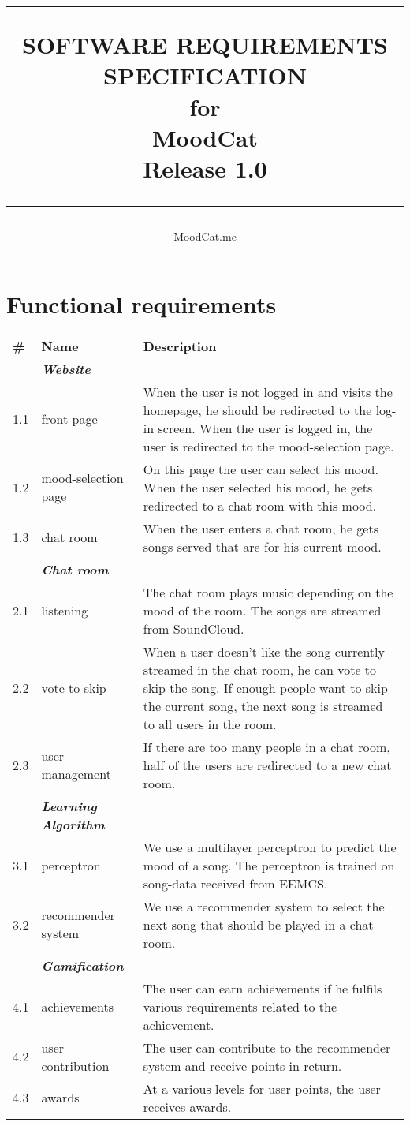 \documentclass{scrreprt}
\title{%
\flushright
\rule{16cm}{5pt}\vskip1cm
\Huge{SOFTWARE REQUIREMENTS\\ SPECIFICATION}\\
\vspace{2cm}
for\\
\vspace{2cm}
MoodCat\\
\vspace{2cm}
\LARGE{Release 1.0\\}
\vfill
\rule{16cm}{5pt}
}
\author{MoodCat.me}
\date{}
\begin{document}
\maketitle



\chapter*{Functional requirements}
\begin{table}[h]
\begin{tabular}{|p{0.5cm}|p{3.5cm}|p{14cm}|}
\textbf{\#} & \textbf{Name} & \textbf{Description} \\
         & \textbf{\textit{Website}} &  \\
   	  1.1   & front page & When the user is not logged in and visits the homepage, he should be redirected to the log-in screen.
   	   When the user is logged in, the user is redirected to the mood-selection page.  \\
      1.2   & mood-selection page & On this page the user can select his mood. When the user selected his mood, he gets redirected to a chat room with this mood.\\
      1.3  	& chat room & When the user enters a chat room, he gets songs served that are for his current mood. \\   
      		 
       	& \textbf{\textit{Chat room}} & \\
	  2.1   & listening & The chat room plays music depending on the mood of the room. The songs are streamed from SoundCloud.\\
	  2.2   & vote to skip & When a user doesn't like the song currently streamed in the chat room, he can vote to skip the song. If enough people want to skip the current song, the next song is streamed to all users in the room. \\
	  2.3   & user management  & If there are too many people in a chat room, half of the users are redirected to a new chat room. \\
	  	& \textbf{\textit{Learning Algorithm}} & \\
	  3.1   & perceptron & We use a multilayer perceptron to predict the mood of a song. The perceptron is trained on song-data received from EEMCS.\\
	  3.2   & recommender system & We use a recommender system to select the next song that should be played in a chat room. \\  
         & \textbf{\textit{Gamification}} &  \\
      4.1   & achievements  & The user can earn achievements if he fulfils various requirements related to the achievement.     \\
      4.2	& user contribution & The user can contribute to the recommender system and receive points in return. \\ 
      4.3   & awards  & At a various levels for user points, the user receives awards.
\end{tabular}
\end{table}
	
\end{document}
